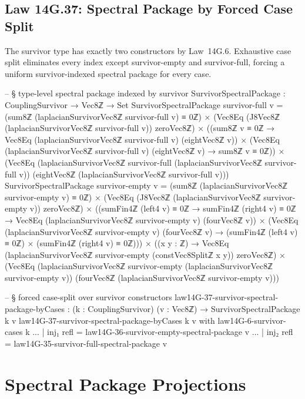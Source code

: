 \documentclass[11pt,a4paper]{book}
\def\texttt#1{#1}%
\begin{document}
\subsection{Law 14G.37: Spectral Package by Forced Case Split}

The survivor type has exactly two constructors by Law~14G.6. Exhaustive case split eliminates every index except \texttt{survivor-empty} and \texttt{survivor-full}, forcing a uniform survivor-indexed spectral package for every case.

\begin{code}
-- § type-level spectral package indexed by survivor
SurvivorSpectralPackage : CouplingSurvivor → Vec8ℤ → Set
SurvivorSpectralPackage survivor-full v =
  (sum8ℤ (laplacianSurvivorVec8ℤ survivor-full v) ≡ 0ℤ) ×
  (Vec8Eq (J8Vec8ℤ (laplacianSurvivorVec8ℤ survivor-full v)) zeroVec8ℤ) ×
  ((sum8ℤ v ≡ 0ℤ → Vec8Eq (laplacianSurvivorVec8ℤ survivor-full v) (eightVec8ℤ v)) ×
   (Vec8Eq (laplacianSurvivorVec8ℤ survivor-full v) (eightVec8ℤ v) → sum8ℤ v ≡ 0ℤ)) ×
  (Vec8Eq (laplacianSurvivorVec8ℤ survivor-full (laplacianSurvivorVec8ℤ survivor-full v))
         (eightVec8ℤ (laplacianSurvivorVec8ℤ survivor-full v)))
SurvivorSpectralPackage survivor-empty v =
  (sum8ℤ (laplacianSurvivorVec8ℤ survivor-empty v) ≡ 0ℤ) ×
  (Vec8Eq (J8Vec8ℤ (laplacianSurvivorVec8ℤ survivor-empty v)) zeroVec8ℤ) ×
  ((sumFin4ℤ (left4 v) ≡ 0ℤ → sumFin4ℤ (right4 v) ≡ 0ℤ → Vec8Eq (laplacianSurvivorVec8ℤ survivor-empty v) (fourVec8ℤ v)) ×
   (Vec8Eq (laplacianSurvivorVec8ℤ survivor-empty v) (fourVec8ℤ v) → (sumFin4ℤ (left4 v) ≡ 0ℤ) × (sumFin4ℤ (right4 v) ≡ 0ℤ))) ×
  ((x y : ℤ) → Vec8Eq (laplacianSurvivorVec8ℤ survivor-empty (constVec8Splitℤ x y)) zeroVec8ℤ) ×
  (Vec8Eq (laplacianSurvivorVec8ℤ survivor-empty (laplacianSurvivorVec8ℤ survivor-empty v))
         (fourVec8ℤ (laplacianSurvivorVec8ℤ survivor-empty v)))

-- § forced case-split over survivor constructors
law14G-37-survivor-spectral-package-byCases : (k : CouplingSurvivor) (v : Vec8ℤ) → SurvivorSpectralPackage k v
law14G-37-survivor-spectral-package-byCases k v with law14G-6-survivor-cases k
... | inj₁ refl = law14G-36-survivor-empty-spectral-package v
... | inj₂ refl = law14G-35-survivor-full-spectral-package v
\end{code}

\section{Spectral Package Projections}
\end{document}
